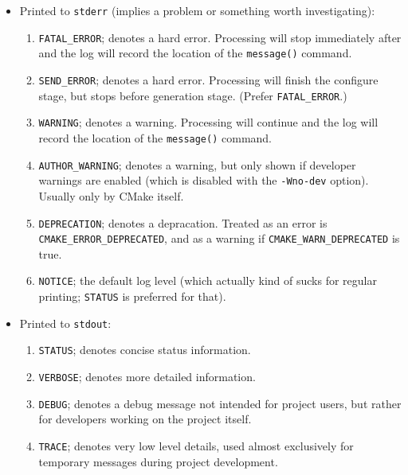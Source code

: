 \documentclass[table, xcdraw]{article}%
\begin{document}
\begin{itemize}
    \item Printed to \texttt{stderr} (implies a problem or something worth investigating):
    \begin{enumerate}
        \item \texttt{FATAL_ERROR}; denotes a hard error. Processing will stop immediately after and the log will record the location of the \texttt{message()} command.
        \item \texttt{SEND_ERROR}; denotes a hard error. Processing will finish the configure stage, but stops before generation stage. (Prefer \texttt{FATAL_ERROR}.)
        \item \texttt{WARNING}; denotes a warning. Processing will continue and the log will record the location of the \texttt{message()} command.
        \item \texttt{AUTHOR_WARNING}; denotes a warning, but only shown if developer warnings are enabled (which is disabled with the \texttt{-Wno-dev} option). Usually only by CMake itself.
        \item \texttt{DEPRECATION}; denotes a depracation. Treated as an error is \texttt{CMAKE_ERROR_DEPRECATED}, and as a warning if \texttt{CMAKE_WARN_DEPRECATED} is true.
        \item \texttt{NOTICE}; the default log level (which actually kind of sucks for regular printing; \texttt{STATUS} is preferred for that).
    \end{enumerate}
    \item Printed to \texttt{stdout}:
    \begin{enumerate}[start=7]
        \item \texttt{STATUS}; denotes concise status information.
        \item \texttt{VERBOSE}; denotes more detailed information.
        \item \texttt{DEBUG}; denotes a debug message not intended for project users, but rather for developers working on the project itself.
        \item \texttt{TRACE}; denotes very low level details, used almost exclusively for temporary messages during project development.
    \end{enumerate}
\end{itemize}
\end{document}
